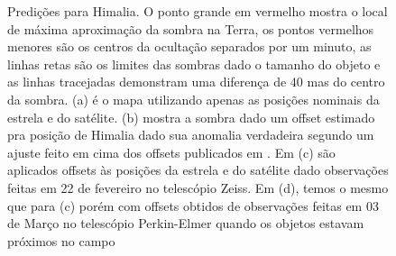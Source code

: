 \documentclass[12pt,a4paper]{monografia}
\begin{document}
\begin{figure}
\begin{centering}
\caption{Predições para Himalia. O ponto grande em vermelho mostra o local de máxima aproximação da sombra na Terra, os pontos vermelhos menores são os centros da ocultação separados por um minuto, as linhas retas são os limites das sombras dado o tamanho do objeto e as linhas tracejadas demonstram uma diferença de 40 mas do centro da sombra. (a) é o mapa utilizando apenas as posições nominais da estrela e do satélite. (b) mostra a sombra dado um offset estimado pra posição de Himalia dado sua anomalia verdadeira segundo um ajuste feito em cima dos offsets publicados em \cite{GomesJunior2015-Irregular}. Em (c) são aplicados offsets às posições da estrela e do satélite dado observações feitas em 22 de fevereiro no telescópio Zeiss. Em (d), temos o mesmo que para (c) porém com offsets obtidos de observações feitas em 03 de Março no telescópio Perkin-Elmer quando os objetos estavam próximos no campo}

\end{centering}
\end{figure}
\end{document}
